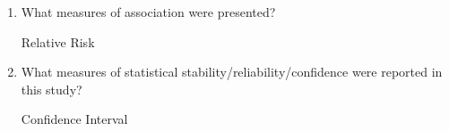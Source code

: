 \begin{enumerate}
\item What measures of association were presented?

\answerSpace{2cm}

\begin{AnswerText}
Relative Risk
\end{AnswerText}

\item What measures of statistical stability/reliability/confidence were reported in this study?

\answerSpace{1cm}

\begin{AnswerText}
Confidence Interval
\end{AnswerText}

%

%

%

 

\end{enumerate}

